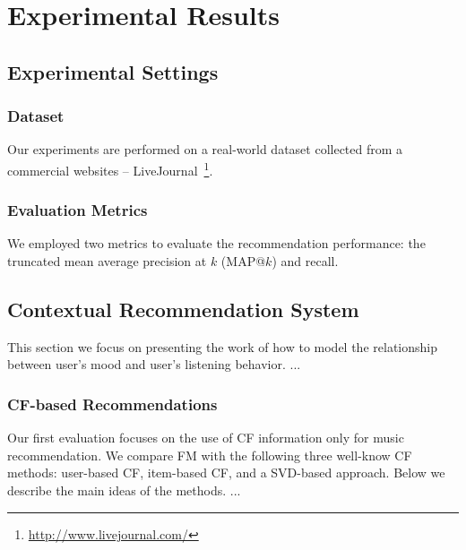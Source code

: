\chapter{Experimental Results}

\section{Experimental Settings}

\subsection{Dataset}
Our experiments are performed on a real-world dataset collected from
a commercial websites -- LiveJournal~\footnote{\url{http://www.livejournal.com/}}.

\subsection{Evaluation Metrics}
We employed two metrics to evaluate the recommendation performance: the
truncated mean average precision at $k$ (MAP@$k$) and recall.

\section{Contextual Recommendation System}
This section we focus on presenting the work of how to model the relationship between
user's mood and user's listening behavior. ... 

\subsection{CF-based Recommendations}
Our first evaluation focuses on the use of CF information only for music recommendation.
We compare FM with the following three well-know CF methods: user-based CF, item-based CF,
and a SVD-based approach. Below we describe the main ideas of the methods. ...

